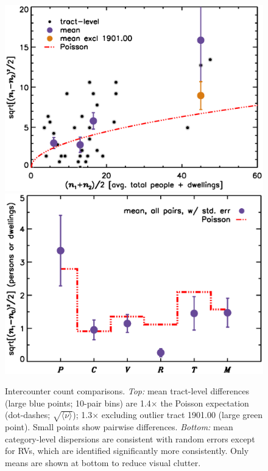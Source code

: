 \documentclass[11pt,twocolumn]{article}
\begin{document}
\begin{figure}[t]
\centering
	\includegraphics[width=\linewidth, trim = 1cm 0cm 0cm 0cm]{intDupeChar}\\
	\includegraphics[width=\linewidth, trim = 1cm 0.5cm 0cm 0cm]{catDupeChar}
\caption{Intercounter count comparisons. {\it Top:} mean tract-level differences (large blue 
		points; 10-pair bins) are 1.4$\times$ the Poisson expectation (dot-dashes; 
		$\sqrt{\langle\nu\rangle}$); 1.3$\times$ excluding outlier tract 1901.00 (large green 
		point). Small points show pairwise differences. {\it Bottom:} mean category-level 
		dispersions are consistent with random errors except for RVs, which are identified 
		significantly more consistently. Only means are shown at bottom to reduce visual
		clutter.}
\label{fig:dupeChar}
\end{figure}
\end{document}
